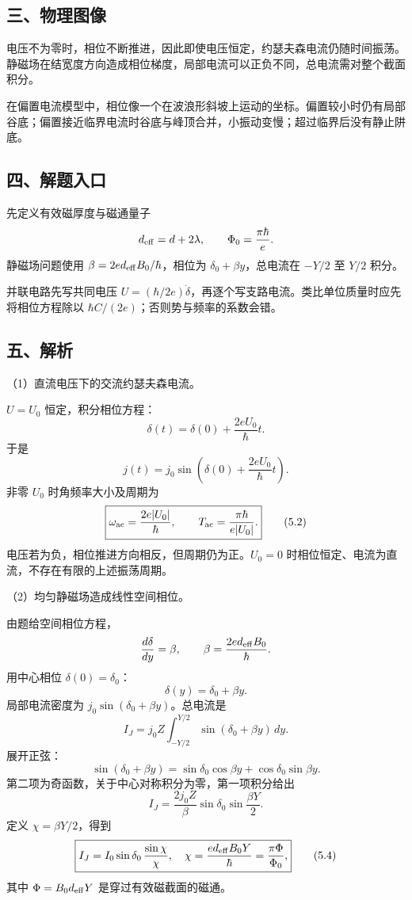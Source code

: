\documentclass[12pt,a4paper,fontset=fandol]{ctexart}
\begin{document}
\subsection{三、物理图像}\label{ux4e09ux7269ux7406ux56feux50cf-4}

电压不为零时，相位不断推进，因此即使电压恒定，约瑟夫森电流仍随时间振荡。静磁场在结宽度方向造成相位梯度，局部电流可以正负不同，总电流需对整个截面积分。

在偏置电流模型中，相位像一个在波浪形斜坡上运动的坐标。偏置较小时仍有局部谷底；偏置接近临界电流时谷底与峰顶合并，小振动变慢；超过临界后没有静止阱底。

\subsection{四、解题入口}\label{ux56dbux89e3ux9898ux5165ux53e3-4}

先定义有效磁厚度与磁通量子 \[
d_{\rm eff}=d+2\lambda,\qquad
\Phi_0=\frac{\pi\hbar}{e}.
\] 静磁场问题使用 \(\beta=2ed_{\rm eff}B_0/\hbar\)，相位为
\(\delta_0+\beta y\)，总电流在 \(-Y/2\) 至 \(Y/2\) 积分。

并联电路先写共同电压
\(U=(\hbar/2e)\dot\delta\)，再逐个写支路电流。类比单位质量时应先将相位方程除以
\(\hbar C/(2e)\)；否则势与频率的系数会错。

\subsection{五、解析}\label{ux4e94ux89e3ux6790-4}

（1）直流电压下的交流约瑟夫森电流。

\(U=U_0\) 恒定，积分相位方程： \[
\delta(t)=\delta(0)+\frac{2eU_0}{\hbar}t.
\] 于是 \[
\boxed{j(t)=j_0\sin\!\left(\delta(0)+\frac{2eU_0}{\hbar}t\right).}\tag{5.1}
\] 非零 \(U_0\) 时角频率大小及周期为 \[
\boxed{\omega_{\rm ac}=\frac{2e|U_0|}{\hbar},\qquad
T_{\rm ac}=\frac{\pi\hbar}{e|U_0|}.}\tag{5.2}
\] 电压若为负，相位推进方向相反，但周期仍为正。\(U_0=0\)
时相位恒定、电流为直流，不存在有限的上述振荡周期。

（2）均匀静磁场造成线性空间相位。

由题给空间相位方程， \[
\frac{d\delta}{dy}=\beta,\qquad
\beta=\frac{2ed_{\rm eff}B_0}{\hbar}.
\] 用中心相位 \(\delta(0)=\delta_0\)： \[
\boxed{\delta(y)=\delta_0+\beta y.}\tag{5.3}
\] 局部电流密度为 \(j_0\sin(\delta_0+\beta y)\)。总电流是 \[
I_J=j_0Z\int_{-Y/2}^{Y/2}\sin(\delta_0+\beta y)\,dy.
\] 展开正弦： \[
\sin(\delta_0+\beta y)
=\sin\delta_0\cos\beta y+\cos\delta_0\sin\beta y.
\] 第二项为奇函数，关于中心对称积分为零，第一项积分给出 \[
I_J=\frac{2j_0Z}{\beta}\sin\delta_0\sin\frac{\beta Y}{2}.
\] 定义 \(\chi=\beta Y/2\)，得到 \[
\boxed{I_J=I_0\sin\delta_0\,\frac{\sin\chi}{\chi},
\quad \chi=\frac{ed_{\rm eff}B_0Y}{\hbar}
=\frac{\pi\Phi}{\Phi_0},}\tag{5.4}
\] 其中 \(\Phi=B_0d_{\rm eff}Y\) 是穿过有效磁截面的磁通。
\end{document}
